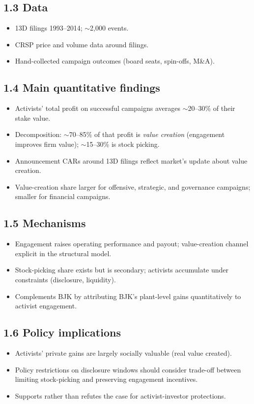 \documentclass[11pt]{article}
\begin{document}
\subsection*{1.3 Data}
\begin{itemize}
\item 13D filings 1993--2014; $\sim$2{,}000 events.
\item CRSP price and volume data around filings.
\item Hand-collected campaign outcomes (board seats, spin-offs, M\&A).
\end{itemize}

\subsection*{1.4 Main quantitative findings}
\begin{itemize}
\item Activists' total profit on successful campaigns averages $\sim$20--30\% of their stake value.
\item Decomposition: $\sim$70--85\% of that profit is \emph{value creation} (engagement improves firm value); $\sim$15--30\% is stock picking.
\item Announcement CARs around 13D filings reflect market's update about value creation.
\item Value-creation share larger for offensive, strategic, and governance campaigns; smaller for financial campaigns.
\end{itemize}

\subsection*{1.5 Mechanisms}
\begin{itemize}
\item Engagement raises operating performance and payout; value-creation channel explicit in the structural model.
\item Stock-picking share exists but is secondary; activists accumulate under constraints (disclosure, liquidity).
\item Complements BJK by attributing BJK's plant-level gains quantitatively to activist engagement.
\end{itemize}

\subsection*{1.6 Policy implications}
\begin{itemize}
\item Activists' private gains are largely socially valuable (real value created).
\item Policy restrictions on disclosure windows should consider trade-off between limiting stock-picking and preserving engagement incentives.
\item Supports rather than refutes the case for activist-investor protections.
\end{itemize}
\end{document}
